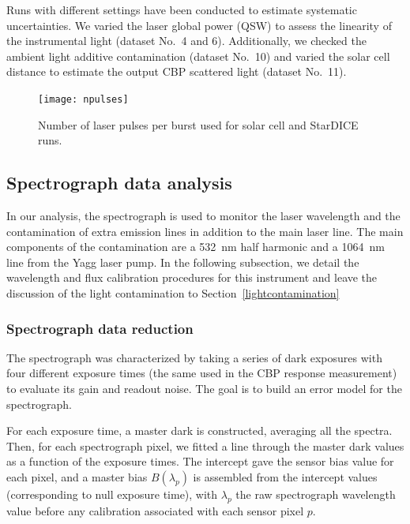 Runs with different settings have been conducted to estimate systematic uncertainties. We varied the laser global power (QSW) to assess the linearity of the instrumental light (dataset No.~4 and 6). Additionally, we checked the ambient light additive contamination (dataset No.~10) and varied the solar cell distance to estimate the output CBP scattered light (dataset No.~11).

\begin{figure}%
\centering
\texttt{[image: npulses]}
\caption{Number of laser pulses per burst used for solar cell and StarDICE runs.}\label{fig:npulses}
\end{figure}

\subsection{Spectrograph data analysis}


In our analysis, the spectrograph is used to monitor the laser wavelength and the contamination of extra emission lines in addition to the main laser line. The main components of the contamination are a \SI{532}{\nm} half harmonic and a \SI{1064}{\nm} line from the Yagg laser pump. In the following subsection, we detail the wavelength and flux calibration procedures for this instrument and leave the discussion of the light contamination to Section~\ref{lightcontamination}



\subsubsection{Spectrograph data reduction}\label{sec:spectro_reduction}


The spectrograph was characterized by taking a series of dark exposures with four different exposure times (the same used in the CBP response measurement) to evaluate its gain and readout noise. The goal is to build an error model for the spectrograph.

For each exposure time, a master dark is constructed, averaging all the spectra. Then, for each spectrograph pixel, we fitted a line through the master dark values as a function of the exposure times. The intercept gave the sensor bias value for each pixel, and a master bias $B(\lambda_p)$ is assembled from the intercept values (corresponding to null exposure time), with $\lambda_p$ the raw spectrograph wavelength value before any calibration associated with each sensor pixel $p$. 


